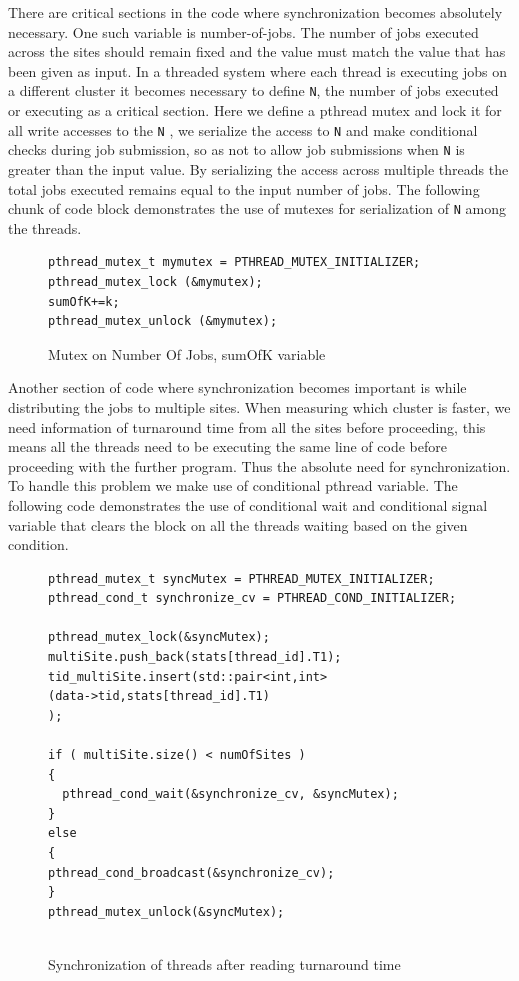 \documentclass[ms,electronic,double]{nuthesis}
\begin{document}
There are critical sections in the code where synchronization becomes absolutely 
necessary. One such variable is number-of-jobs. The number of jobs executed across 
the sites should remain fixed and the value must match the value that has been 
given as input. In a threaded system where each thread is executing jobs on a 
different cluster it becomes necessary to define \texttt{N}, the number of jobs executed or executing as a 
critical section. Here we define a pthread mutex and lock it for all write accesses to the \texttt{N}
, we serialize the access to \texttt{N} and make conditional checks during job submission, so as not to allow
job submissions when \texttt{N} is greater than the input value. By 
serializing the access across multiple threads the total jobs executed remains 
equal to the input number of jobs. The following chunk of code block 
demonstrates the use of mutexes for serialization of  \texttt{N} among the threads.

\begin{figure}[htbp!]

\begin{lstlisting}
pthread_mutex_t mymutex = PTHREAD_MUTEX_INITIALIZER;
pthread_mutex_lock (&mymutex);
sumOfK+=k;
pthread_mutex_unlock (&mymutex);
\end{lstlisting}

\caption{Mutex on Number Of Jobs, sumOfK variable}
\label{fig:mutex}

\end{figure}


Another section of code where synchronization becomes important is while 
distributing the jobs to multiple sites. When measuring which cluster is 
faster, we need information of turnaround time from all the sites 
before proceeding, this means all the threads need to be executing the same line of code 
before proceeding with the further program. Thus the absolute need for 
synchronization. To handle this problem we make use of conditional pthread variable. The following code demonstrates the use of conditional wait 
and conditional signal variable that clears the block on all the threads waiting 
based on the given condition.


\begin{figure}[htbp!]

\begin{lstlisting}
pthread_mutex_t syncMutex = PTHREAD_MUTEX_INITIALIZER;
pthread_cond_t synchronize_cv = PTHREAD_COND_INITIALIZER;

pthread_mutex_lock(&syncMutex);    
multiSite.push_back(stats[thread_id].T1);	
tid_multiSite.insert(std::pair<int,int>
(data->tid,stats[thread_id].T1)
);
	   
if ( multiSite.size() < numOfSites )
{
  pthread_cond_wait(&synchronize_cv, &syncMutex);
}
else
{		
pthread_cond_broadcast(&synchronize_cv);
}
pthread_mutex_unlock(&syncMutex);
    
\end{lstlisting}
\caption{Synchronization of threads after reading turnaround time}
\label{fig:synchronization}
\end{figure}
\FloatBarrier
\end{document}
